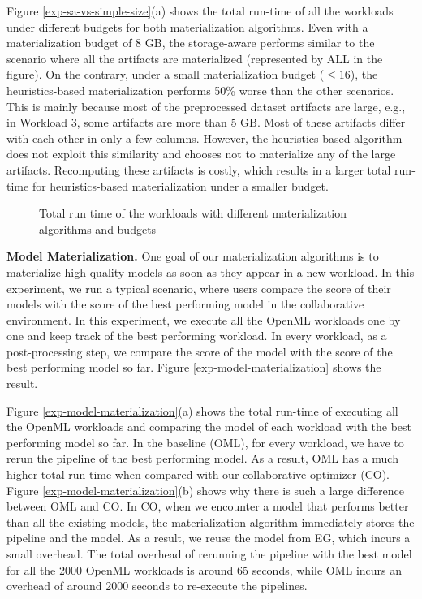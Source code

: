 Figure \ref{exp-sa-vs-simple-size}(a) shows the total run-time of all the workloads under different budgets for both materialization algorithms.
Even with a materialization budget of 8 GB, the storage-aware performs similar to the scenario where all the artifacts are materialized (represented by ALL in the figure).
On the contrary, under a small materialization budget ($\leq 16$), the heuristics-based materialization performs 50\% worse than the other scenarios.
This is mainly because most of the preprocessed dataset artifacts are large, e.g., in Workload 3, some artifacts are more than 5 GB.
Most of these artifacts differ with each other in only a few columns.
However, the heuristics-based algorithm does not exploit this similarity and chooses not to materialize any of the large artifacts.
Recomputing these artifacts is costly, which results in a larger total run-time for heuristics-based materialization under a smaller budget.

\begin{figure}
\centering
 \resizebox{0.7\columnwidth}{!}{%
%
}
\caption{Total run time of the workloads with different materialization algorithms and budgets}
\label{run-time-vs-mat}
\end{figure}

\textbf{Model Materialization. }
One goal of our materialization algorithms is to materialize high-quality models as soon as they appear in a new workload.
In this experiment, we run a typical scenario, where users compare the score of their models with the score of the best performing model in the collaborative environment.
In this experiment, we execute all the OpenML workloads one by one and keep track of the best performing workload.
In every workload, as a post-processing step, we compare the score of the model with the score of the best performing model so far.
Figure \ref{exp-model-materialization} shows the result.

Figure \ref{exp-model-materialization}(a) shows the total run-time of executing all the OpenML workloads and comparing the model of each workload with the best performing model so far.
In the baseline (OML), for every workload, we have to rerun the pipeline of the best performing model.
As a result, OML has a much higher total run-time when compared with our collaborative optimizer (CO).
Figure \ref{exp-model-materialization}(b) shows why there is such a large difference between OML and CO.
In CO, when we encounter a model that performs better than all the existing models, the materialization algorithm immediately stores the pipeline and the model.
As a result, we reuse the model from EG, which incurs a small overhead.
The total overhead of rerunning the pipeline with the best model for all the 2000 OpenML workloads is around 65 seconds, while OML incurs an overhead of around 2000 seconds to re-execute the pipelines.

